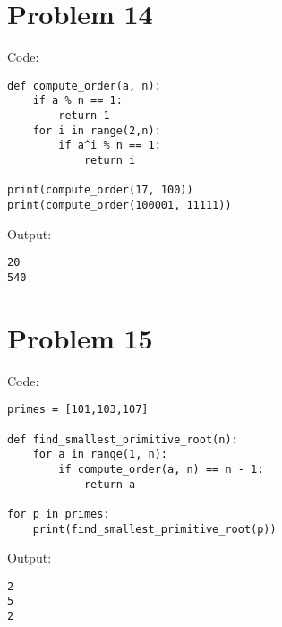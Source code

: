 \documentclass{article}
\theoremstyle{definition}
\begin{document}
\section*{Problem 14}
    \begin{mdframed}
        Code:
        \begin{verbatim}
def compute_order(a, n):
    if a % n == 1:
        return 1
    for i in range(2,n):
        if a^i % n == 1:
            return i

print(compute_order(17, 100))
print(compute_order(100001, 11111))
        \end{verbatim}
        Output:
        \begin{verbatim}
20
540
        \end{verbatim}
    \end{mdframed}
\section*{Problem 15}
    \begin{mdframed}
        Code:
        \begin{verbatim}
primes = [101,103,107]

def find_smallest_primitive_root(n):
    for a in range(1, n):
        if compute_order(a, n) == n - 1:
            return a

for p in primes:
    print(find_smallest_primitive_root(p))
        \end{verbatim}
        Output:
        \begin{verbatim}
2
5
2
        \end{verbatim}
    \end{mdframed}
\end{document}

